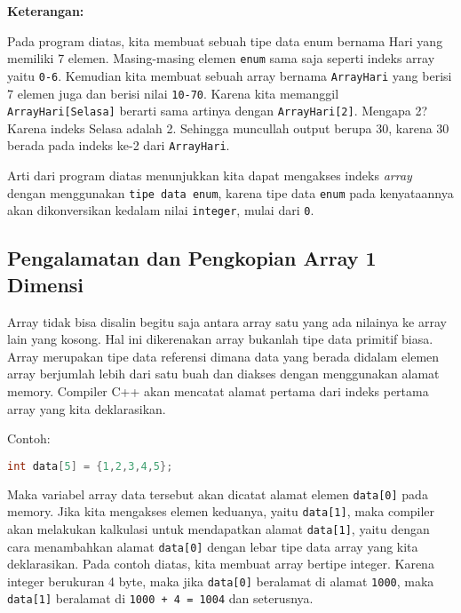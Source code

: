 \textbf{Keterangan:}

Pada program diatas, kita membuat sebuah tipe data enum bernama Hari
yang memiliki 7 elemen. Masing-masing elemen \texttt{enum} sama saja
seperti indeks array yaitu \texttt{0-6}. Kemudian kita membuat sebuah
array bernama \texttt{ArrayHari} yang berisi 7 elemen juga dan berisi
nilai \texttt{10-70}. Karena kita memanggil \\
\texttt{ArrayHari{[}Selasa{]}} berarti sama artinya dengan
\texttt{ArrayHari{[}2{]}}. Mengapa 2? Karena indeks Selasa adalah 2.
Sehingga muncullah output berupa 30, karena 30 berada pada indeks ke-2
dari \texttt{ArrayHari}.

Arti dari program diatas menunjukkan kita dapat mengakses indeks
\emph{array} dengan menggunakan \texttt{tipe\ data\ enum}, karena tipe
data \texttt{enum} pada kenyataannya akan dikonversikan kedalam nilai
\texttt{integer}, mulai dari \texttt{0}.

\subsection{Pengalamatan dan Pengkopian Array 1
Dimensi}\label{pengalamatan-dan-pengkopian-array-1-dimensi}

Array tidak bisa disalin begitu saja antara array satu yang ada nilainya
ke array lain yang kosong. Hal ini dikerenakan array bukanlah tipe data
primitif biasa. Array merupakan tipe data referensi dimana data yang
berada didalam elemen array berjumlah lebih dari satu buah dan diakses
dengan menggunakan alamat memory. Compiler C++ akan mencatat alamat
pertama dari indeks pertama array yang kita deklarasikan.

Contoh:

\begin{lstlisting}[language=c++, numbers=none]
int data[5] = {1,2,3,4,5};
\end{lstlisting}

Maka variabel array data tersebut akan dicatat alamat elemen
\texttt{data{[}0{]}} pada memory. Jika kita mengakses elemen keduanya,
yaitu \texttt{data{[}1{]}}, maka compiler akan melakukan kalkulasi untuk
mendapatkan alamat \texttt{data{[}1{]}}, yaitu dengan cara menambahkan
alamat \texttt{data{[}0{]}} dengan lebar tipe data array yang kita
deklarasikan. Pada contoh diatas, kita membuat array bertipe integer.
Karena integer berukuran 4 byte, maka jika \texttt{data{[}0{]}}
beralamat di alamat \texttt{1000}, maka \texttt{data{[}1{]}} beralamat
di \texttt{1000\ +\ 4\ =\ 1004} dan seterusnya.

